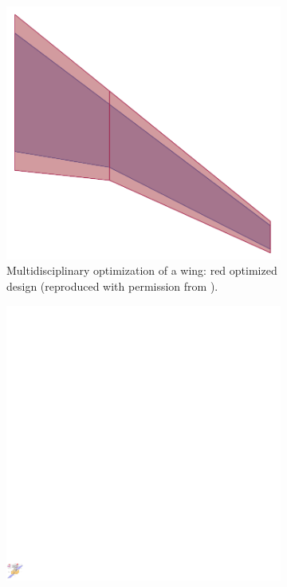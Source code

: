 \documentclass[12pt]{article}
\begin{document}
	\begin{figure}[t]
		\begin{subfigure}[t]{0.3\textwidth}
			\includegraphics[width=\columnwidth]{MDo_wing.png}%
			\caption{Multidisciplinary optimization of a wing: red optimized design (reproduced with permission from \cite{masColomer2021mdo}).}
			\label{fig:wing}
		\end{subfigure}\hfill
		\begin{subfigure}[t]{0.3\textwidth}
			\includegraphics[width=\columnwidth]{Codesign_satellite.pdf} 

\end{subfigure}
\end{figure}
\end{document}

